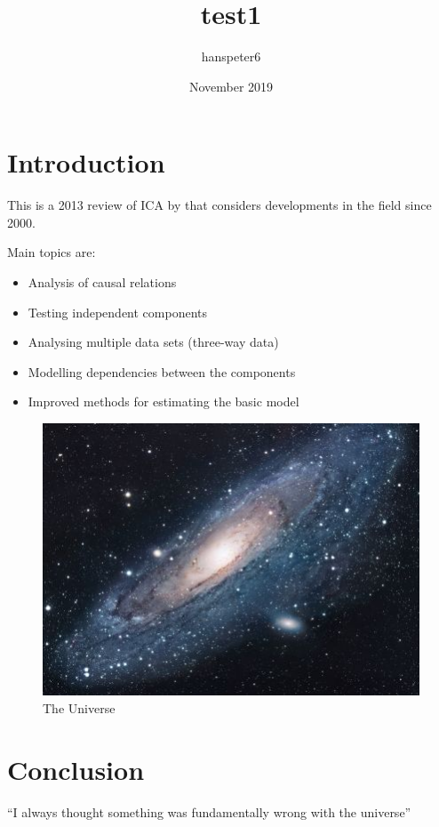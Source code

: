\documentclass{article}
\title{test1}
\author{hanspeter6 }
\date{November 2019}
\begin{document}
\maketitle

\section{Introduction}
This is a 2013 review of ICA by \cite{hyvarinen2013independent} that considers developments in the field since 2000.

Main topics are:
\begin{itemize}
  \item Analysis of causal relations
  \item Testing independent components
  \item Analysing multiple data sets (three-way data)
  \item Modelling dependencies between the components
  \item Improved methods for estimating the basic model
\end{itemize}

\begin{figure}[h!]
\centering
\includegraphics[scale=1.7]{universe}
\caption{The Universe}
\label{fig:universe}
\end{figure}

\section{Conclusion}
``I always thought something was fundamentally wrong with the universe'' \citep{adams1995hitchhiker}



\end{document}
